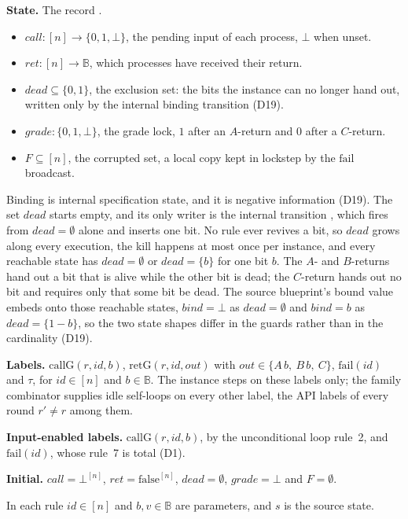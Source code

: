 \medskip
\noindent\textbf{State.} The record .
\begin{itemize}
  \item $call : [n] \to \{0,1,\bot\}$, the pending input of each process, $\bot$ when unset.
  \item $ret : [n] \to \mathbb{B}$, which processes have received their return.
  \item $dead \subseteq \{0,1\}$, the exclusion set: the bits the instance can no longer hand out, written only by the internal binding transition (D19).
  \item $grade : \{0,1,\bot\}$, the grade lock, $1$ after an $A$-return and $0$ after a $C$-return.
  \item $F \subseteq [n]$, the corrupted set, a local copy kept in lockstep by the $\mathrm{fail}$ broadcast.
\end{itemize}
\noindent Binding is internal specification state, and it is negative information (D19).
The set $dead$ starts empty, and its only writer is the internal transition , which fires from $dead = \emptyset$ alone and inserts one bit.
No rule ever revives a bit, so $dead$ grows along every execution, the kill happens at most once per instance, and every reachable state has $dead = \emptyset$ or $dead = \{b\}$ for one bit $b$.
The $A$- and $B$-returns hand out a bit that is alive while the other bit is dead; the $C$-return hands out no bit and requires only that some bit be dead.
The source blueprint's bound value embeds onto those reachable states, $bind = \bot$ as $dead = \emptyset$ and $bind = b$ as $dead = \{1-b\}$, so the two state shapes differ in the guards rather than in the cardinality (D19).

\noindent\textbf{Labels.}
$\mathrm{callG}(r,id,b)$, $\mathrm{retG}(r,id,out)$ with $out \in \{A\,b,\ B\,b,\ C\}$, $\mathrm{fail}(id)$ and $\tau$, for $id \in [n]$ and $b \in \mathbb{B}$.
The instance steps on these labels only; the family combinator supplies idle self-loops on every other label, the API labels of every round $r' \neq r$ among them.

\noindent\textbf{Input-enabled labels.}
$\mathrm{callG}(r,id,b)$, by the unconditional loop rule~2, and $\mathrm{fail}(id)$, whose rule~7 is total (D1).

\noindent\textbf{Initial.}
$call = \bot^{[n]}$, $ret = \mathrm{false}^{[n]}$, $dead = \emptyset$, $grade = \bot$ and $F = \emptyset$.

\medskip
\noindent In each rule $id \in [n]$ and $b, v \in \mathbb{B}$ are parameters, and $s$ is the source state.

